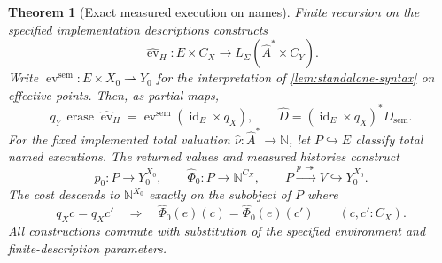 \documentclass[11pt,a4paper]{article}
\numberwithin{algorithm}{section}
\numberwithin{equation}{section}
\newtheorem{theorem}{Theorem}[section]
\theoremstyle{definition}
\theoremstyle{remark}
\theoremstyle{plain}
\newcommand{\N}{\mathbb N}
\newcommand{\LL}{L_{\Sigma}}
\newcommand{\id}{\operatorname{id}}
\newcommand{\incl}{\hookrightarrow}
\newcommand{\onto}{\twoheadrightarrow}
\newcommand{\pmap}{\rightharpoonup}
\theoremstyle{definition}
\theoremstyle{plain}
\begin{document}
\begin{theorem}[Exact measured execution on names]
\label{thm:measured-name-presentation}
Finite recursion on the specified implementation descriptions constructs
\begin{equation}\label{eq:named-history-evaluator}
 \widehat{\operatorname{ev}}_H:
 E\times C_X\longrightarrow\LL(\widehat A^*\times C_Y).
\end{equation}
Write $\operatorname{ev}^{\mathrm{sem}}:E\times X_0\pmap Y_0$ for
the interpretation of \cref{lem:standalone-syntax} on effective points. Then, as
partial maps,
\begin{equation}\label{eq:measured-name-adequacy}
 q_Y\,\operatorname{erase}\widehat{\operatorname{ev}}_H
 =\operatorname{ev}^{\mathrm{sem}}(\id_E\times q_X),\qquad
 \widehat D=(\id_E\times q_X)^*D_{\mathrm{sem}}.
\end{equation}
For the fixed implemented total valuation
$\widehat\nu:\widehat A^*\to\N$, let $P\incl E$ classify total
named executions. The returned values and measured histories construct
\begin{equation}\label{eq:named-measured-image}
 p_0:P\to Y_0^{X_0},\qquad
 \widehat\Phi_0:P\to\N^{C_X},\qquad
 P\xrightarrow{p\,\onto}V\incl Y_0^{X_0}.
\end{equation}
The cost descends to $\N^{X_0}$ exactly on the subobject of $P$ where
\begin{equation}\label{eq:cost-name-descent}
 q_Xc=q_Xc'\quad\Longrightarrow\quad
 \widehat\Phi_0(e)(c)=\widehat\Phi_0(e)(c')
 \qquad(c,c':C_X).
\end{equation}
All constructions commute with substitution of the specified environment
and finite-description parameters.
\end{theorem}
\end{document}
